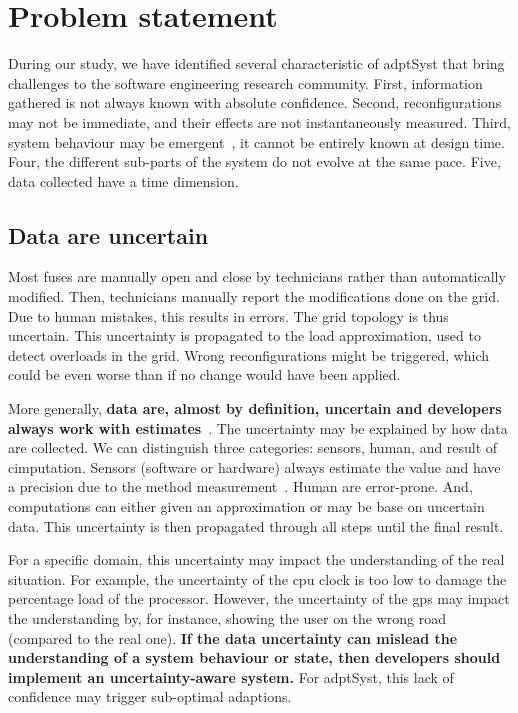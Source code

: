 \section{Problem statement}

During our study, we have identified several characteristic of \gls{adptSyst} that bring challenges to the software engineering research community.
First, information gathered is not always known with absolute confidence.
Second, reconfigurations may not be immediate, and their effects are not instantaneously measured.
Third, system behaviour may be emergent~\cite{zio2011uncertainties}, \ie it cannot be entirely known at design time.
Four, the different sub-parts of the system do not evolve at the same pace.
Five, data collected have a time dimension.


\subsection{Data are uncertain}
Most fuses are manually open and close by technicians rather than automatically modified.
Then, technicians manually report the modifications done on the grid.
Due to human mistakes, this results in errors.
The grid topology is thus uncertain.
This uncertainty is propagated to the load approximation, used to detect overloads in the grid.
Wrong reconfigurations might be triggered, which could be even worse than if no change would have been applied.

More generally, \textbf{data are, almost by definition, uncertain and developers always work with estimates}~\cite{DBLP:conf/asplos/BornholtMM14, metrology2008evaluation, DBLP:journals/tkde/AggarwalY09}.
The uncertainty may be explained by how data are collected.
We can distinguish three categories: sensors, human, and result of cimputation.
Sensors (software or hardware) always estimate the value and have a precision due to the method measurement~\cite{metrology2008evaluation, DBLP:conf/asplos/BornholtMM14}.
Human are error-prone.
And, computations can either given an approximation or may be base on uncertain data.
This uncertainty is then propagated through all steps until the final result.

For a specific domain, this uncertainty may impact the understanding of the real situation.
For example, the uncertainty of the \gls{cpu} clock is too low to damage the percentage load of the processor.
However, the uncertainty of the \gls{gps} may impact the understanding by, for instance, showing the user on the wrong road (compared to the real one).
\textbf{If the data uncertainty can mislead the understanding of a system behaviour or state, then developers should implement an uncertainty-aware system.}
For \gls{adptSyst}, this lack of confidence may trigger sub-optimal adaptions.


